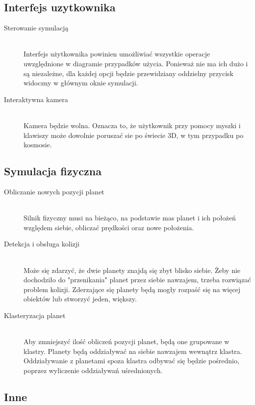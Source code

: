 \subsection{Interfejs uzytkownika}

\begin{description}
	\item[Sterowanie symulacją] \hfill \\
	Interfejs użytkownika powinien umożliwiać wszystkie operacje uwzględnione w diagramie przypadków użycia. Ponieważ nie ma ich dużo i są niezależne, dla każdej opcji będzie przewidziany oddzielny przycisk widoczny w głównym oknie symulacji.
	\item[Interaktywna kamera] \hfill \\
	Kamera będzie wolna. Oznacza to, że użytkownik przy pomocy myszki i klawiszy może dowolnie poruszać sie po świecie 3D, w tym przypadku po kosmosie.
\end{description}

\subsection{Symulacja fizyczna}

\begin{description}
	\item[Obliczanie nowych pozycji planet] \hfill \\
	Silnik fizyczny musi na bieżąco, na podstawie mas planet i ich położeń względem siebie, obliczać prędkości oraz nowe położenia. 
	\item[Detekcja i obsługa kolizji] \hfill \\
	Może się zdarzyć, że dwie planety znajdą się zbyt blisko siebie. Żeby nie dochodziło do "przenikania" planet przez siebie nawzajem, trzeba rozwiązać problem kolizji. Zderzające się planety będą mogły rozpaść się na więcej obiektów lub stworzyć jeden, większy.
	\item[Klasteryzacja planet] \hfill \\
	Aby zmniejszyć ilość obliczeń pozycji planet, będą one grupowane w klastry. Planety będą oddziaływać na siebie nawzajem wewnątrz klastra. Oddziaływanie z planetami spoza klastra odbywać się będzie pośrednio, poprzez wyliczenie oddziaływań uśrednionych.

\end{description}

\subsection{Inne}

